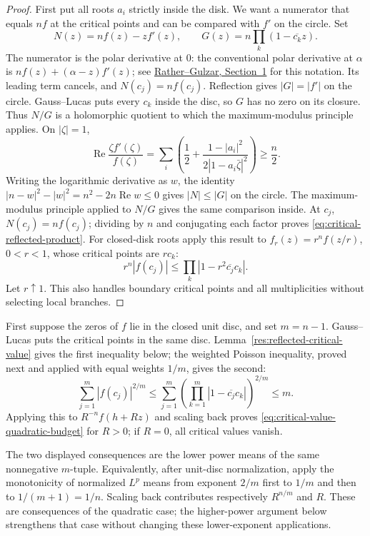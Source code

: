 \documentclass[11pt]{article}
\begin{document}
\begin{proof}
First put all roots $a_i$ strictly inside the disk. We want a numerator
that equals $nf$ at the critical points and can be compared with $f'$
on the circle. Set
\[
 N(z)=nf(z)-zf'(z),\qquad
 G(z)=n\prod_k(1-\overline{c_k}z).
\]
The numerator is the polar derivative at $0$: the conventional polar
derivative at $\alpha$ is $nf(z)+(\alpha-z)f'(z)$; see
\href{https://arxiv.org/abs/1303.0068v1}{Rather--Gulzar, Section~1} for this
notation. Its leading term cancels, and $N(c_j)=nf(c_j)$.
Reflection gives $|G|=|f'|$ on the circle. Gauss--Lucas puts every
$c_k$ inside the disc, so $G$ has no zero on its closure. Thus $N/G$
is a holomorphic quotient to which the maximum-modulus principle applies.  On $|\zeta|=1$,
\[
 \operatorname{Re}\frac{\zeta f'(\zeta)}{f(\zeta)}
 =\sum_i\left(\frac12+
       \frac{1-|a_i|^2}{2|1-a_i\bar\zeta|^2}\right)\ge\frac n2.
\]
Writing the logarithmic derivative as $w$, the identity
$|n-w|^2-|w|^2=n^2-2n\operatorname{Re}w\le0$ gives
$|N|\le|G|$ on the circle.  The maximum-modulus principle applied to
$N/G$ gives the same comparison inside.  At $c_j$, $N(c_j)=nf(c_j)$;
dividing by $n$ and conjugating each factor proves
\eqref{eq:critical-reflected-product}.
For closed-disk roots apply this result to
$f_r(z)=r^nf(z/r)$, $0<r<1$, whose critical points are $rc_k$:
\[
 r^n|f(c_j)|\le\prod_k|1-r^2\overline{c_j}c_k|.
\]
Let $r\uparrow1$.  This also handles boundary critical points and all
multiplicities without selecting local branches.
\end{proof}

First suppose the zeros of $f$ lie in the closed unit disc, and set
$m=n-1$. Gauss--Lucas puts the critical points in the same disc.
Lemma~\ref{res:reflected-critical-value} gives the first inequality below;
the weighted Poisson inequality, proved next and applied with equal
weights $1/m$, gives the second:
\[
 \sum_{j=1}^m|f(c_j)|^{2/m}
 \le\sum_{j=1}^m\left(\prod_{k=1}^m
             |1-\overline{c_j}c_k|\right)^{2/m}\le m.
\]  Applying this to
$R^{-n}f(h+Rz)$ and scaling back proves
\eqref{eq:critical-value-quadratic-budget} for $R>0$; if $R=0$, all critical
values vanish.

The two displayed consequences are the lower power means of the same
nonnegative $m$-tuple.  Equivalently, after unit-disc normalization, apply
the monotonicity of normalized $L^p$ means from exponent $2/m$ first to
$1/m$ and then to $1/(m+1)=1/n$.  Scaling back contributes respectively
$R^{n/m}$ and $R$. These are consequences of the quadratic case;
the higher-power argument below strengthens that case without changing
these lower-exponent applications.
\end{document}

